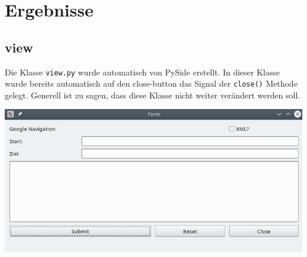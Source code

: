 
\section{Ergebnisse}
\subsection{view}
Die Klasse \verb|view.py| wurde automatisch von PySide erstellt. In dieser Klasse wurde bereits automatisch auf den close-button das Signal der \verb|close()| Methode gelegt. 
Generell ist zu sagen, dass diese Klasse nicht weiter verändert werden soll.

\begin{minipage}{\linewidth}
	\centering
	\includegraphics[width=0.8\linewidth]{images/gui}
\end{minipage}

